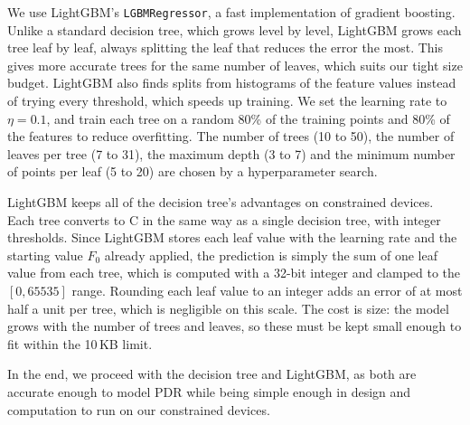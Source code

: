 We use LightGBM's \texttt{LGBMRegressor}, a fast implementation of
gradient boosting. Unlike a standard decision tree, which grows
level by level, LightGBM grows each tree leaf by leaf, always
splitting the leaf that reduces the error the most. This gives more
accurate trees for the same number of leaves, which suits our tight
size budget. LightGBM also finds splits from histograms of the
feature values instead of trying every threshold, which speeds up
training. We set the learning rate to $\eta = 0.1$, and train each
tree on a random 80\% of the training points and 80\% of the
features to reduce overfitting. The number of trees (10 to 50), the
number of leaves per tree (7 to 31), the maximum depth (3 to 7) and
the minimum number of points per leaf (5 to 20) are chosen by a
hyperparameter search.

LightGBM keeps all of the decision tree's advantages on constrained
devices. Each tree converts to C in the same way as a single decision
tree, with integer thresholds. Since LightGBM stores each leaf value
with the learning rate and the starting value $F_0$ already applied,
the prediction is simply the sum of one leaf value from each tree,
which is computed with a 32-bit integer and clamped to the
$[0, 65535]$ range. Rounding each leaf value to an integer adds an
error of at most half a unit per tree, which is negligible on this
scale. The cost is size: the model grows with the number of trees and
leaves, so these must be kept small enough to fit within the
10\,KB limit.

In the end, we proceed with the decision tree and LightGBM, as both
are accurate enough to model PDR while being simple enough in design
and computation to run on our constrained devices.
